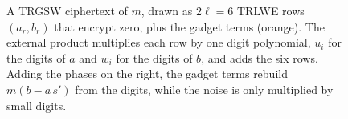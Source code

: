 \begin{figure}[!htb]
\centering

\caption{A TRGSW ciphertext of $m$, drawn as $2\ell=6$ TRLWE rows
$(a_r,b_r)$ that encrypt zero, plus the gadget terms (orange). The external
product multiplies each row by one digit polynomial, $u_i$ for the digits of
$a$ and $w_i$ for the digits of $b$, and adds the six rows. Adding the phases on
the right, the gadget terms rebuild $m(b-a\,s')$ from the digits, while the
noise is only multiplied by small digits.}
\label{fig:trgsw}
\end{figure}
